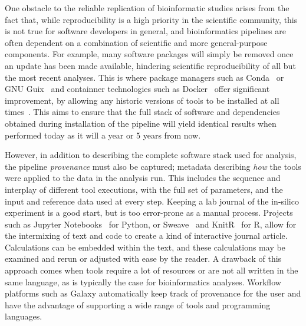\begin{justify}

One obstacle to the reliable replication of bioinformatic studies arises from the fact that, while reproducibility is a high priority in the scientific community, this is not true for software developers in general, and bioinformatics pipelines are often dependent on a combination of scientific and more general-purpose components. For example, many software packages will simply be removed once an update has been made available, hindering scientific reproducibility of all but the most recent analyses. This is where package managers such as Conda~\cite{conda} or GNU Guix~\cite{courtes2013functional} and containner technologies such as Docker~\cite{url-docker} offer significant improvement, by allowing any historic versions of tools to be installed at all times~\cite{kulkarni2018reproducible}. This aims to ensure that the full stack of software and dependencies obtained during installation of the pipeline will yield identical results when performed today as it will a year or 5 years from now.

However, in addition to describing the complete software stack used for analysis, the pipeline \emph{provenance} must also be captured; metadata describing \emph{how} the tools were applied to the data in the analysis run. This includes the sequence and interplay of different tool executions, with the full set of parameters, and the input and reference data used at every step. Keeping a lab journal of the in-silico experiment is a good start, but is too error-prone as a manual process. Projects such as Jupyter Notebooks~\cite{kluyver2016jupyter} for Python, or Sweave~\cite{leisch2002sweave} and KnitR~\cite{xie2014knitr} for R, allow for the intermixing of text and code to create a kind of interactive journal article. Calculations can be embedded within the text, and these calculations may be examined and rerun or adjusted with ease by the reader. A drawback of this approach comes when tools require a lot of resources or are not all written in the same language, as is typically the case for bioinformatics analyses. Workflow platforms such as Galaxy automatically keep track of provenance for the user and have the advantage of supporting a wide range of tools and programming languages.


\end{justify}
